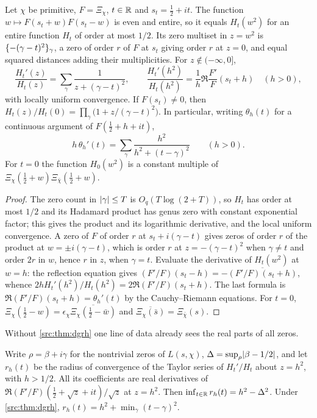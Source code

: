 \begin{lemma}\label{rec:lem:square}
Let $\chi$ be primitive, $F=\Xi_\chi$, $t\in\mathbb{R}$ and $s_t=\tfrac12+it$. The function
$w\mapsto F(s_t+w)F(s_t-w)$ is even and entire, so it equals $H_t(w^2)$ for an entire function
$H_t$ of order at most $1/2$. Its zero multiset in $z=w^2$ is $\{-(\gamma-t)^2\}_\gamma$, a
zero of order $r$ of $F$ at $s_t$ giving order $r$ at $z=0$, and equal squared distances adding
their multiplicities. For $z\notin(-\infty,0]$,
\begin{equation}\label{rec:eq:stieltjes}
 \frac{H_t'(z)}{H_t(z)}=\sum_\gamma\frac1{z+(\gamma-t)^2},
 \qquad
 \frac{H_t'(h^2)}{H_t(h^2)}=\frac1h\Re\frac{F'}{F}(s_t+h)\quad(h>0),
\end{equation}
with locally uniform convergence. If $F(s_t)\ne0$, then
$H_t(z)/H_t(0)=\prod_\gamma\bigl(1+z/(\gamma-t)^2\bigr)$. In particular, writing $\theta_h(t)$ for
a continuous argument of $F(\tfrac12+h+it)$,
\begin{equation}\label{rec:eq:phase}
 h\,\theta_h'(t)=\sum_\gamma\frac{h^2}{h^2+(t-\gamma)^2}\qquad(h>0).
\end{equation}
For $t=0$ the function $H_0(w^2)$ is a constant multiple of
$\Xi_\chi(\tfrac12+w)\Xi_{\bar\chi}(\tfrac12+w)$.
\end{lemma}

\begin{proof}
The zero count in $\lvert\gamma\rvert\le T$ is $O_q(T\log(2+T))$, so $H_t$ has order at most $1/2$ and
its Hadamard product has genus zero with constant exponential factor; this gives the product
and its logarithmic derivative, and the local uniform convergence. A zero of $F$ of order $r$ at
$s_t+i(\gamma-t)$ gives zeros of order $r$ of the product at $w=\pm i(\gamma-t)$, which is order
$r$ at $z=-(\gamma-t)^2$ when $\gamma\ne t$ and order $2r$ in $w$, hence $r$ in $z$, when
$\gamma=t$. Evaluate the derivative of $H_t(w^2)$ at $w=h$: the reflection equation gives
$(F'/F)(s_t-h)=-\overline{(F'/F)(s_t+h)}$, whence $2hH_t'(h^2)/H_t(h^2)=2\Re(F'/F)(s_t+h)$. The
last formula is $\Re(F'/F)(s_t+h)=\theta_h'(t)$ by the Cauchy--Riemann equations. For $t=0$,
$\Xi_\chi(\tfrac12-w)=\epsilon_\chi\overline{\Xi_\chi(\tfrac12-\bar w)}$ and
$\overline{\Xi_\chi(\bar s)}=\Xi_{\bar\chi}(s)$.
\end{proof}

Without \cref{src:thm:dgrh} one line of data already sees the real parts of all zeros.

\begin{corollary}\label{rec:cor:radius}
Write $\rho=\beta+i\gamma$ for the nontrivial zeros of $L(s,\chi)$, $\Delta=\sup_\rho\lvert\beta-1/2\rvert$,
and let $r_h(t)$ be the radius of convergence of the Taylor series of $H_t'/H_t$ about $z=h^2$,
with $h>1/2$. All its coefficients are real derivatives of $\Re(F'/F)(\tfrac12+\sqrt z+it)/\sqrt z$
at $z=h^2$. Then $\inf_{t\in\mathbb{R}}r_h(t)=h^2-\Delta^2$. Under \cref{src:thm:dgrh},
$r_h(t)=h^2+\min_\gamma(t-\gamma)^2$.
\end{corollary}

